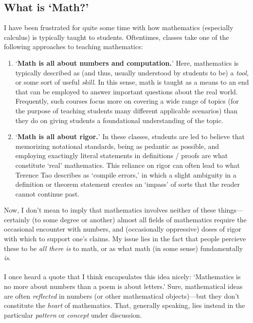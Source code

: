 \documentclass[10pt]{article}
\theoremstyle{definition}
\begin{document}
\subsection{What is `Math?'}
I have been frustrated for quite some time with how mathematics
(especially calculus) is typically taught to students.  Oftentimes,
classes take one of the following approaches to teaching mathematics:
\begin{enumerate}
    \item `\textbf{Math is all about numbers and computation.}'  Here,
      mathematics is typically described as (and thus, usually
      understood by students to be) a \emph{tool}, or some sort of
      useful \emph{skill}.  In this sense, math is taught as a means
      to an end that can be employed to answer important questions
      about the real world.  Frequently, such courses focus more on
      covering a wide range of topics (for the purpose of teaching
      students many different applicable scenarios) than they do on
      giving students a foundational understanding of the topic.
    \item `\textbf{Math is all about rigor.}'  In these classes,
      students are led to believe that memorizing notational
      standards, being as pedantic as possible, and employing
      exactingly literal statements in definitions / proofs are what
      constitute `real' mathematics.  This reliance on rigor can often
      lead to what Terence Tao describes as `compile errors,' in which
      a slight ambiguity in a definition or theorem statement creates
      an `impass' of sorts that the reader cannot continue past.
\end{enumerate}
Now, I don't mean to imply that mathematics involves neither of these
things---certainly (to some degree or another) almost all fields of
mathematics require the occasional encounter with numbers, and
(occasionally oppressive) doses of rigor with which to support one's
claims.  My issue lies in the fact that people percieve these to be
\emph{all there is} to math, or as what math (in some sense)
fundamentally \emph{is}.\\~\\
I once heard a quote that I think encapsulates this idea nicely:
`Mathematics is no more about numbers than a poem is about letters.'
Sure, mathematical ideas are often \emph{reflected} in numbers (or
other mathematical objects)---but they don't constitute the
\emph{heart} of mathematics.  That, generally speaking, lies instead
in the particular \emph{pattern} or \emph{concept} under discussion.
\end{document}
